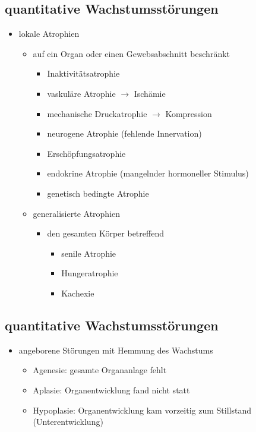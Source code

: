 \subsection{quantitative Wachstumsstörungen}
	\begin{itemize}
		\item lokale Atrophien
			\begin{itemize}
				\item auf ein Organ oder einen Gewebsabschnitt beschränkt
					\begin{itemize}
						\item Inaktivitätsatrophie
						\item vaskuläre Atrophie $\rightarrow$ Ischämie
						\item mechanische Druckatrophie $\rightarrow$ Kompression
						\item neurogene Atrophie (fehlende Innervation)
						\item Erschöpfungsatrophie
						\item endokrine Atrophie (mangelnder hormoneller Stimulus)
						\item genetisch bedingte Atrophie
					\end{itemize}
				\item generalisierte Atrophien
					\begin{itemize}
						\item den gesamten Körper betreffend
							\begin{itemize}
								\item senile Atrophie
								\item Hungeratrophie
								\item Kachexie
							\end{itemize}
				\end{itemize}
		\end{itemize}
	\end{itemize}

\subsection{quantitative Wachstumsstörungen}
	\begin{itemize}
		\item angeborene Störungen mit Hemmung des Wachstums
			\begin{itemize}
				\item Agenesie: gesamte Organanlage fehlt
				\item Aplasie: Organentwicklung fand nicht statt
				\item Hypoplasie: Organentwicklung kam vorzeitig zum Stillstand (Unterentwicklung)
			\end{itemize}
	\end{itemize}

